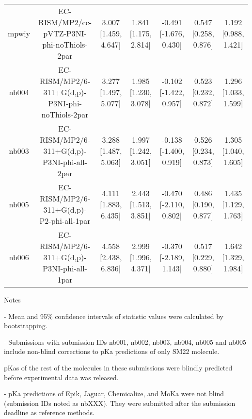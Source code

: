 \documentclass{article}
\begin{document}
\begin{center}
\begin{longtable}{|ccccccc|}
 mpwiy &         EC-RISM/MP2/cc-pVTZ-P3NI-phi-noThiols-2par &  3.007 [1.459, 4.647] &  1.841 [1.175, 2.814] &   -0.491 [-1.676, 0.430] &  0.547 [0.258, 0.876] &   1.192 [0.988, 1.421] \\
 nb004 &    EC-RISM/MP2/6-311+G(d,p)-P3NI-phi-noThiols-2par &  3.277 [1.497, 5.077] &  1.985 [1.230, 3.078] &   -0.102 [-1.422, 0.957] &  0.523 [0.232, 0.872] &   1.296 [1.033, 1.599] \\
 nb003 &         EC-RISM/MP2/6-311+G(d,p)-P3NI-phi-all-2par &  3.288 [1.487, 5.063] &  1.997 [1.242, 3.051] &   -0.138 [-1.400, 0.919] &  0.526 [0.234, 0.873] &   1.305 [1.040, 1.605] \\
 nb005 &           EC-RISM/MP2/6-311+G(d,p)-P2-phi-all-1par &  4.111 [1.883, 6.435] &  2.443 [1.513, 3.851] &   -0.470 [-2.110, 0.802] &  0.486 [0.190, 0.877] &   1.435 [1.129, 1.763] \\
 nb006 &         EC-RISM/MP2/6-311+G(d,p)-P3NI-phi-all-1par &  4.558 [2.438, 6.836] &  2.999 [1.996, 4.371] &   -0.370 [-2.189, 1.143] &  0.517 [0.229, 0.880] &   1.642 [1.329, 1.984] \\
\end{longtable}
\end{center}

Notes

- Mean and 95\% confidence intervals of statistic values were calculated by bootstrapping.

- Submissions with submission IDs nb001, nb002, nb003, nb004, nb005 and nb005 include non-blind corrections to pKa predictions of only SM22 molecule.

pKas of the rest of the molecules in these submissions were blindly predicted before experimental data was released.

- pKa predictions of Epik, Jaguar, Chemicalize, and MoKa were not blind (submission IDs noted as nbXXX). They were submitted after the submission deadline as reference methods.
\end{document}
